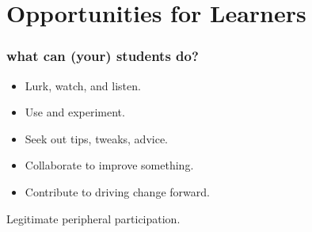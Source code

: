 \section{Opportunities for Learners}
\begin{comment}
* What can your students do?
** One example (pick one - Fedora & your first-year class)
** Documentation
** Translation
** Gardening
** Bug fixing
** Testing
** Artwork/design
** Marketing/outreach
** Being active and vocal users (use open source in outreach/service projects - for instance, Mo & the Girl Scouts) / advocacy
** Legal/licensing work (very, *very* basic stuff)
** it's the non-programming skills that are usually in most need by these communities, because nobody knows about them / how to do them, so you can almost become domain "experts" in a project
** Creative repurposing - bringing a project into a new domain it wasn't necessarily originally designed for
\end{comment}



\begin{frame} 
\frametitle{what can (your) students do?}
\begin{itemize}
	\item Lurk, watch, and listen.
	\item Use and experiment.
	\item Seek out tips, tweaks, advice.
	\item Collaborate to improve something.
	\item Contribute to driving change forward.
\end{itemize}

\end{frame} 



\begin{frame} 

\huge
\begin{center}
Legitimate peripheral \alert{participation}.
\end{center}

\end{frame} 



